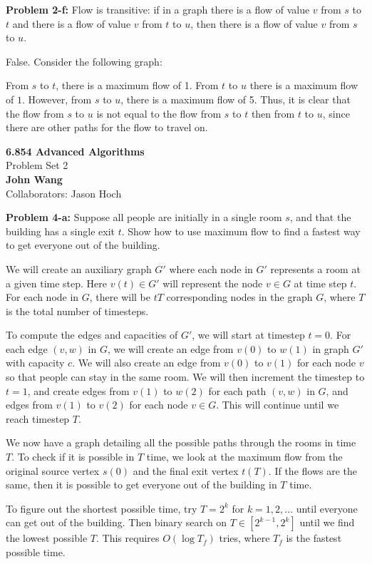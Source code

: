 \documentclass[psamsfonts]{amsart}
\newenvironment{sol}{\vspace{0.25cm}{\large \bfseries Solution:}}{\qedsymbol}
\newenvironment{prob}[1]{\begin{framed}{\large \bfseries Problem #1:}}{\end{framed}}
\newcommand{\makenewtitle}{
    \begin{center}
    {\huge \bfseries 6.854 Advanced Algorithms} \\
    Problem Set 2\\
    \vspace{0.25cm}
    {\bfseries John Wang} \\
    Collaborators: Jason Hoch
    \end{center}
    \vspace{0.5cm}
}
\begin{document}
\begin{prob}{2-f}
Flow is transitive: if in a graph there is a flow of value $v$ from $s$ to $t$ and there is a flow of value $v$ from $t$ to $u$, then there is a flow of value $v$ from $s$ to $u$.
\end{prob}
\begin{sol}
False. Consider the following graph:
\begin{figure}[h!]
\centering
{}
\end{figure}

From $s$ to $t$, there is a maximum flow of 1. From $t$ to $u$ there is a maximum flow of $1$. However, from $s$ to $u$, there is a maximum flow of 5. Thus, it is clear that the flow from $s$ to $u$ is not equal to the flow from $s$ to $t$ then from $t$ to $u$, since there are other paths for the flow to travel on. 
\end{sol}

\newpage
\makenewtitle

\begin{prob}{4-a}
Suppose all people are initially in a single room $s$, and that the building has a single exit $t$. Show how to use maximum flow to find a fastest way to get everyone out of the building.
\end{prob}
\begin{sol}
We will create an auxiliary graph $G'$ where each node in $G'$ represents a room at a given time step. Here $v(t) \in G'$ will represent the node $v \in G$ at time step $t$. For each node in $G$, there will be $tT$ corresponding nodes in the graph $G$, where $T$ is the total number of timesteps.

To compute the edges and capacities of $G'$, we will start at timestep $t=0$. For each edge $(v,w)$ in $G$, we will create an edge from $v(0)$ to $w(1)$ in graph $G'$ with capacity $c$. We will also create an edge from $v(0)$ to $v(1)$ for each node $v$ so that people can stay in the same room. We will then increment the timestep to $t=1$, and create edges from $v(1)$ to $w(2)$ for each path $(v,w)$ in $G$, and edges from $v(1)$ to $v(2)$ for each node $v \in G$. This will continue until we reach timestep $T$. 

We now have a graph detailing all the possible paths through the rooms in time $T$. To check if it is possible in $T$ time, we look at the maximum flow from the original source vertex $s(0)$ and the final exit vertex $t(T)$. If the flows are the same, then it is possible to get everyone out of the building in $T$ time. 

To figure out the shortest possible time, try $T=2^{k}$ for $k=1,2,\ldots$ until everyone can get out of the building. Then binary search on $T \in [2^{k-1}, 2^{k}]$ until we find the lowest possible $T$. This requires $O(\log T_{f})$ tries, where $T_f$ is the fastest possible time.
\end{sol}
\end{document}
